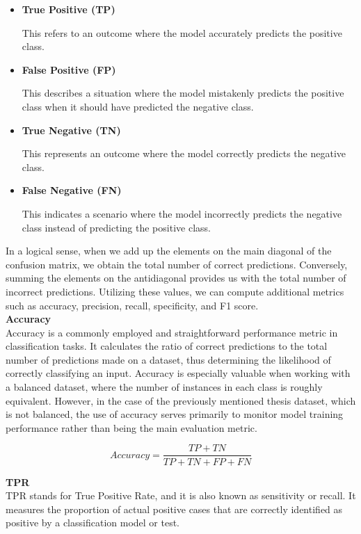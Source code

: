 \begin{itemize}
\item \textbf{True Positive (TP)}

This refers to an outcome where the model accurately predicts the positive class.
\item \textbf{False Positive (FP)}

This describes a situation where the model mistakenly predicts the positive class when it should have predicted the negative class.
\item \textbf{True Negative (TN)}

This represents an outcome where the model correctly predicts the negative class.
\item \textbf{False Negative (FN)}

This indicates a scenario where the model incorrectly predicts the negative class instead of predicting the positive class.

\end{itemize}

In a logical sense, when we add up the elements on the main diagonal of the confusion matrix,
we obtain the total number of correct predictions.
Conversely, summing the elements on the antidiagonal provides us with the total number of incorrect predictions.
Utilizing these values, we can compute additional metrics such as accuracy, precision, recall, specificity, and F1 score. \\

\vspace{0.5cm}
\textbf{Accuracy} \\

\noindent Accuracy is a commonly employed and straightforward performance metric in classification tasks. It calculates the ratio of correct predictions to the total number of predictions made on a dataset, thus determining the likelihood of correctly classifying an input. Accuracy is especially valuable when working with a balanced dataset, where the number of instances in each class is roughly equivalent. However, in the case of the previously mentioned thesis dataset, which is not balanced, the use of accuracy serves primarily to monitor model training performance rather than being the main evaluation metric.

\[Accuracy = \frac{TP + TN}{TP + TN + FP + FN}\]

\vspace{0.5cm}
\textbf{TPR} \\

TPR stands for True Positive Rate, and it is also known as sensitivity or recall.
It measures the proportion of actual positive cases that are correctly identified as positive
by a classification model or test.

